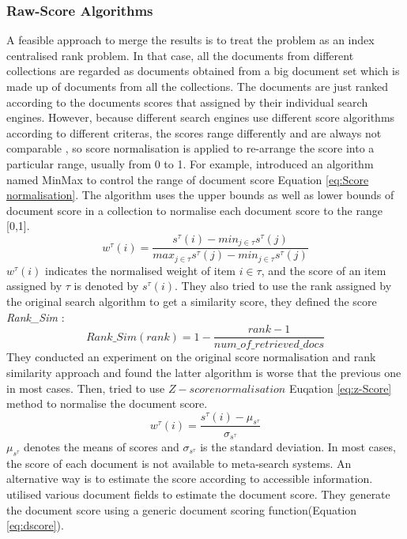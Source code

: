 \subsubsection{Raw-Score Algorithms}
A feasible approach to merge the results is to treat the problem as an index centralised rank problem. In that case, all the documents from different collections are regarded as documents obtained from a big document set which is made up of documents from all the collections. The documents are just ranked according to the documents scores that assigned by their individual search engines. However, because different search engines use different score algorithms according to different criteras, the scores range differently and are always not comparable , so score normalisation is applied to re-arrange the score into a particular range, usually from 0 to 1. For example, \cite{Lee1997,Renda2003} introduced an algorithm named MinMax to control the range of document score Equation \eqref{eq:Score normalisation}. The algorithm uses the upper bounds as well as lower bounds of document score in a collection to normalise each document score to the range [0,1]. 
\begin{equation}
\label{eq:Score normalisation}
	w^{\tau}(i)=\frac{s^\tau(i)-min_{j\in\tau}s^\tau(j)}{max_{j\in\tau}s^\tau(j)-min_{j\in\tau}s^\tau(j)}
\end{equation}
 $w^{\tau}(i)$ indicates the normalised weight of item $i\in\tau$, and the score of an item assigned by $\tau$ is denoted by $s^\tau(i)$. They also tried to use the rank assigned by the original search algorithm to get a similarity score, they defined the score \textit{Rank\_Sim} :
 \begin{equation}
 \label{eq:rank_sim}
 	Rank\_Sim(rank)=1-\frac{rank-1}{num\_of\_retrieved\_docs}
 \end{equation}
 They conducted an experiment on the original score normalisation and rank similarity approach and found the latter algorithm is worse that the previous one in most cases. Then, \cite{Renda2003} tried to use $Z-score normalisation$ Euqation \eqref{eq:z-Score} method to normalise the document score.
\begin{equation}
\label{eq:z-Score}
	 w^{\tau}(i)=\frac{s^\tau(i)-\mu_{s^\tau}}{\sigma_{s^\tau}}
\end{equation}
 $\mu_{s^\tau}$ denotes the means of scores and $\sigma_{s^\tau}$ is the standard deviation. In most cases, the score of each document is not available to meta-search systems. An alternative way is to estimate the score according to accessible information. \cite{Rasolofo2003} utilised various document fields to estimate the document score. They generate the document score using a generic document scoring function(Equation \eqref{eq:dscore}). 
